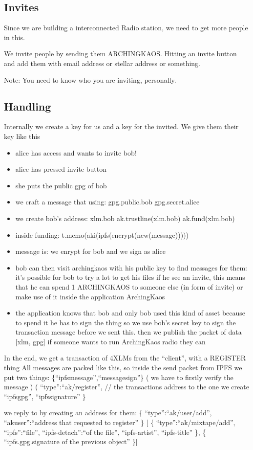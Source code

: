 \hypertarget{invites}{%
\subsection{Invites}\label{invites}}

Since we are building a interconnected Radio station, we need to get
more people in this.

We invite people by sending them ARCHINGKAOS. Hitting an invite button
and add them with email address or stellar address or something.

Note: You need to know who you are inviting, personally.

\hypertarget{handling}{%
\subsection{Handling}\label{handling}}

Internally we create a key for us and a key for the invited. We give
them their key like this

\begin{itemize}
\item
  alice has access and wants to invite bob!
\item
  alice has pressed invite button
\item
  she puts the public gpg of bob
\item
  we craft a message that using: gpg.public.bob gpg.secret.alice
\item
  we create bob's address: xlm.bob ak.trustline(xlm.bob)
  ak.fund(xlm.bob)
\item
  inside funding: t.memo(aki(ipfs(encrypt(new(message)))))
\item
  message is: we enrypt for bob and we sign as alice
\item
  bob can then visit archingkaos with his public key to find messages
  for them: it's possible for bob to try a lot to get his files if he
  see an invite, this means that he can spend 1 ARCHINGKAOS to someone
  else (in form of invite) or make use of it inside the application
  ArchingKaos
\item
  the application knows that bob and only bob used this kind of asset
  because to spend it he has to sign the thing so we use bob's secret
  key to sign the transaction message before we sent this. then we
  publish the packet of data {[}xlm, gpg{]} if someone wants to run
  ArchingKaos radio they can
\end{itemize}

In the end, we get a transaction of 4XLMs from the ``client'', with a
REGISTER thing All messages are packed like this, so inside the send
packet from IPFS we put two things: \{``ipfsmessage'',``messagesign''\}
( we have to firstly verify the message ) ( ``type'':``ak/register'', //
the transactions address to the one we create ``ipfsgpg'',
``ipfssignature'' \}

we reply to by creating an address for them: \{
``type'':``ak/user/add'', ``akuser'':``address that requested to
register'' \} {[} \{ ``type'':``ak/mixtape/add'', ``ipfs'':``file'',
``ipfs-detach'':``of the file'', ``ipfs-artist'', ``ipfs-title'' \}, \{
``ipfs.gpg.signature of the previous object'' \}{]}
